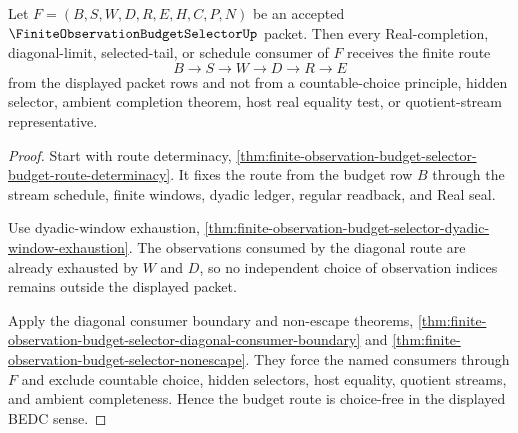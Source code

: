 \begin{theorem}
\label{thm:finite-observation-budget-selector-budget-choice-freeness}
Let $F=(B,S,W,D,R,E,H,C,P,N)$ be an accepted $\FiniteObservationBudgetSelectorUp$ packet. Then every Real-completion, diagonal-limit, selected-tail, or schedule consumer of $F$ receives the finite route
$$
B \to S \to W \to D \to R \to E
$$
from the displayed packet rows and not from a countable-choice principle, hidden selector, ambient completion theorem, host real equality test, or quotient-stream representative.
\end{theorem}
\begin{proof}
Start with route determinacy, \autoref{thm:finite-observation-budget-selector-budget-route-determinacy}. It fixes the route from the budget row $B$ through the stream schedule, finite windows, dyadic ledger, regular readback, and Real seal.

Use dyadic-window exhaustion, \autoref{thm:finite-observation-budget-selector-dyadic-window-exhaustion}. The observations consumed by the diagonal route are already exhausted by $W$ and $D$, so no independent choice of observation indices remains outside the displayed packet.

Apply the diagonal consumer boundary and non-escape theorems, \autoref{thm:finite-observation-budget-selector-diagonal-consumer-boundary} and \autoref{thm:finite-observation-budget-selector-nonescape}. They force the named consumers through $F$ and exclude countable choice, hidden selectors, host equality, quotient streams, and ambient completeness. Hence the budget route is choice-free in the displayed BEDC sense.
\end{proof}

